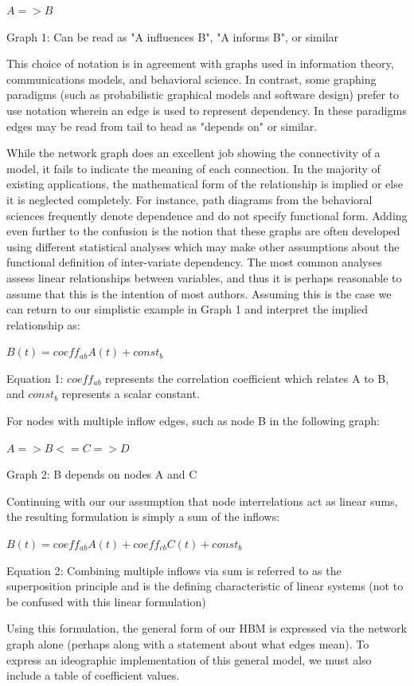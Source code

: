 \documentclass[conference]{IEEEtran}
\begin{document}
$A => B$

Graph 1: Can be read as "A influences B", "A informs B", or similar

This choice of notation is in agreement with graphs used in information theory, communications models, and behavioral science.
In contrast, some graphing paradigms (such as probabilistic graphical models and software design) prefer to use notation wherein an edge is used to represent dependency.
In these paradigms edges may be read from tail to head as "depends on" or similar.

While the network graph does an excellent job showing the connectivity of a model, it fails to indicate the meaning of each connection.
In the majority of existing applications, the mathematical form of the relationship is implied or else it is neglected completely.
For instance, path diagrams from the behavioral sciences frequently denote dependence and do not specify functional form.
Adding even further to the confusion is the notion that these graphs are often developed using different statistical analyses which may make other assumptions about the functional definition of inter-variate dependency.
The most common analyses assess linear relationships between variables, and thus it is perhaps reasonable to assume that this is the intention of most authors.
Assuming this is the case we can return to our simplistic example in Graph 1 and interpret the implied relationship as:

$B(t) = coeff_{ab}A(t) + const_b$

Equation 1: $coeff_{ab}$ represents the correlation coefficient which relates A to B, 
and $const_b$ represents a scalar constant.

For nodes with multiple inflow edges, such as node B in the following graph:

$A => B <= C => D$

Graph 2: B depends on nodes A and C

Continuing with our our assumption that node interrelations act as linear sums, the resulting formulation is simply a sum of the inflows:

$B(t) = coeff_{ab}A(t) + coeff_{cb}C(t) + const_b$

Equation 2: Combining multiple inflows via sum is referred to as the superposition principle and is the defining characteristic of linear systems (not to be confused with this linear formulation)

Using this formulation, the general form of our HBM is expressed via the network graph alone (perhaps along with a statement about what edges mean).
To express an ideographic implementation of this general model, we must also include a table of coefficient values. 
\end{document}
